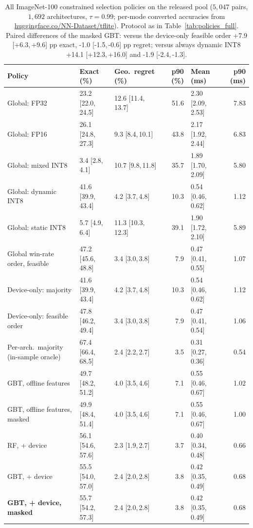 \begin{table}[!htbp]
\centering
\caption{All ImageNet-100 constrained selection policies on the released pool
($5{,}047$ pairs, $1{,}692$ architectures, $\tau=0.99$; per-mode converted
accuracies from \url{huggingface.co/NN-Dataset/tflite}). Protocol as in
Table~\ref{tab:policies_full}. Paired differences of the masked GBT: versus
the device-only feasible order +7.9 [+6.3,\,+9.6] pp exact,
-1.0 [-1.5,\,-0.6] pp regret; versus always dynamic INT8
+14.1 [+12.3,\,+16.0] and -1.9 [-2.4,\,-1.3].}
\label{tab:im100constr}
\footnotesize
\setlength{\tabcolsep}{4pt}
\begin{tabular}{@{}lllrlr@{}}
\toprule
\textbf{Policy} & \textbf{Exact (\%)} & \textbf{Geo.\ regret (\%)} & \textbf{p90 (\%)} & \textbf{Mean (ms)} & \textbf{p90 (ms)}\\
\midrule
Global: FP32 & 23.2 [22.0,\,24.5] & 12.6 [11.4,\,13.7] & 51.6 & 2.30 [2.09,\,2.53] & 7.83 \\
Global: FP16 & 26.1 [24.8,\,27.3] & 9.3 [8.4,\,10.1] & 43.8 & 2.17 [1.92,\,2.44] & 6.83 \\
Global: mixed INT8 & 3.4 [2.8,\,4.1] & 10.7 [9.8,\,11.8] & 35.7 & 1.89 [1.70,\,2.09] & 5.80 \\
Global: dynamic INT8 & 41.6 [39.9,\,43.4] & 4.2 [3.7,\,4.8] & 10.3 & 0.54 [0.46,\,0.62] & 1.12 \\
Global: static INT8 & 5.7 [4.9,\,6.4] & 11.3 [10.3,\,12.3] & 39.1 & 1.90 [1.72,\,2.10] & 5.89 \\
\midrule
Global win-rate order, feasible & 47.2 [45.6,\,48.8] & 3.4 [3.0,\,3.8] & 7.9 & 0.47 [0.41,\,0.55] & 1.07 \\
Device-only: majority & 41.6 [39.9,\,43.4] & 4.2 [3.7,\,4.8] & 10.3 & 0.54 [0.46,\,0.62] & 1.12 \\
Device-only: feasible order & 47.8 [46.2,\,49.4] & 3.4 [3.0,\,3.8] & 7.9 & 0.47 [0.41,\,0.54] & 1.06 \\
Per-arch.\ majority (in-sample oracle) & 67.4 [66.4,\,68.5] & 2.4 [2.2,\,2.7] & 3.5 & 0.31 [0.27,\,0.36] & 0.54 \\
\midrule
GBT, offline features & 49.7 [48.2,\,51.2] & 4.0 [3.5,\,4.6] & 7.1 & 0.55 [0.46,\,0.67] & 1.02 \\
GBT, offline features, masked & 49.9 [48.4,\,51.4] & 4.0 [3.5,\,4.6] & 7.1 & 0.55 [0.46,\,0.67] & 1.00 \\
RF, + device & 56.1 [54.6,\,57.6] & 2.3 [1.9,\,2.7] & 3.7 & 0.40 [0.34,\,0.48] & 0.66 \\
GBT, + device & 55.5 [54.0,\,57.0] & 2.4 [2.0,\,2.8] & 3.8 & 0.42 [0.35,\,0.49] & 0.68 \\
\textbf{GBT, + device, masked} & 55.7 [54.2,\,57.3] & 2.4 [2.0,\,2.8] & 3.8 & 0.42 [0.35,\,0.49] & 0.68 \\
\bottomrule
\end{tabular}
\end{table}

